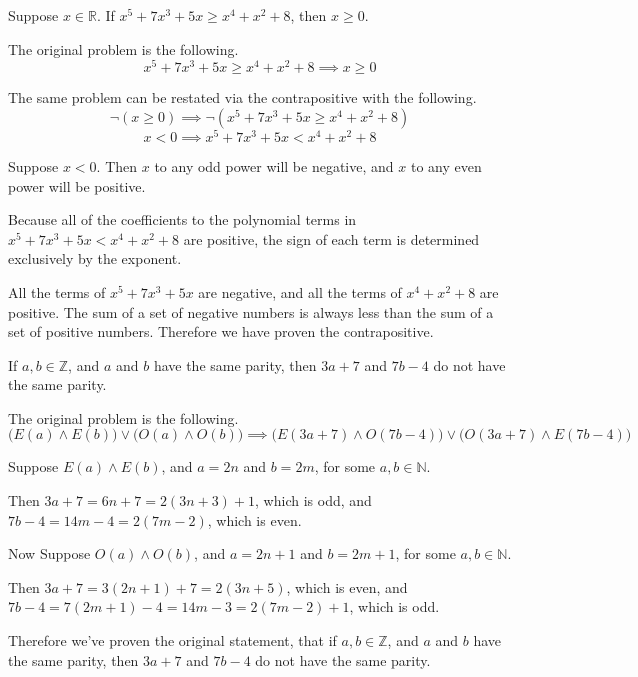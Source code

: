 \documentclass[openany, 12pt]{book}
\begin{document}
\begin{exercise}{}{}
	Suppose $x \in \mathbb{R}$. If $x^5 + 7x^3 + 5x \geq x^4
		+ x^2 +8$, then $x\geq 0$.
	\begin{alist}
		\item The original problem is the following.
		$$x^5 + 7x^3 + 5x \geq x^4 + x^2 +8
			\implies
			x\geq 0$$

		\item The same problem can be restated via the contrapositive with the
		following.
		$$
			\neg(x \geq 0)
			\implies
			\neg(x^5 + 7x^3 + 5x \geq x^4 + x^2 +8)
		$$
		$$
			x < 0
			\implies
			x^5 + 7x^3 + 5x < x^4 + x^2 +8
		$$
		\item Suppose $ x < 0$. Then $x$ to any odd power will be negative, and
		$x$ to any even power will be positive.
		\item Because all of the coefficients to the polynomial terms in
		$x^5 + 7x^3 + 5x < x^4 + x^2 +8$ are positive, the sign of each term is
		determined exclusively by the exponent.
		\item All the terms of $x^5 + 7x^3 + 5x$ are negative, and all the terms of
		$x^4 + x^2 +8$ are positive. The sum of a set of negative numbers
		is always less than the sum of a set of positive numbers. Therefore we
		have proven the contrapositive.
	\end{alist}
\end{exercise}

\begin{exercise}{}{}
	If $a, b \in \mathbb{Z}$, and $a$ and $b$ have the same
	parity, then $3a+7$ and $7b-4$ do not have the same parity.
	\begin{alist}
		\item The original problem is the following.
		$$
			\big(E(a) \land E(b)\big)
			\lor
			\big(O(a) \land O(b)\big)
			\implies
			\big(E(3a+7) \land O(7b-4)\big)
			\lor
			\big(O(3a+7) \land E(7b-4)\big)
		$$
		\item Suppose $E(a) \land E(b)$, and $a=2n$ and $b=2m$, for some $a, b \in
			\mathbb{N}$.
		\item Then $3a+7 = 6n + 7 = 2(3n+3) + 1$, which is odd, and $7b-4 = 14m - 4
			= 2(7m -2)$, which is even.
		\item Now Suppose $O(a) \land O(b)$, and $a=2n+1$ and $b=2m+1$, for some $a, b \in
			\mathbb{N}$.
		\item Then $3a+7 = 3(2n+1) + 7 = 2(3n+5)$, which is even, and $7b-4 =
			7(2m+1) -4 = 14m - 3 = 2(7m -2) +1$, which is odd.
		\item Therefore we've proven the original statement, that if $a, b \in
			\mathbb{Z}$, and $a$ and $b$ have the same parity, then $3a+7$ and
		$7b-4$ do not have the same parity.
		\item
	\end{alist}
\end{exercise}
\end{document}
